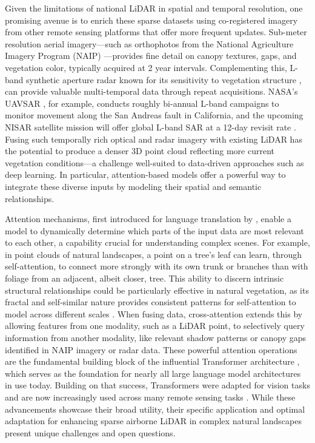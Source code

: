 \documentclass[preprints,article,accept,pdftex,moreauthors]{Definitions/mdpi}
\begin{document}
Given the limitations of national LiDAR in spatial and temporal resolution, one promising avenue is to enrich these sparse datasets using co-registered imagery from other remote sensing platforms that offer more frequent updates.  Sub-meter resolution aerial imagery—such as orthophotos from the National Agriculture Imagery Program (NAIP) \cite{usda_naip_2024}—provides fine detail on canopy textures, gaps, and vegetation color, typically acquired at 2 year intervals. Complementing this, L-band synthetic aperture radar known for its sensitivity to vegetation structure \cite{wang2025interpretable}, can provide valuable multi-temporal data through repeat acquisitions. NASA’s UAVSAR \cite{rosen2006uavsar}, for example, conducts roughly bi-annual L-band campaigns to monitor movement along the San Andreas fault in California, and the upcoming NISAR satellite mission will offer global L-band SAR at a 12-day revisit rate \cite{kellogg2020nasa}. Fusing such temporally rich optical and radar imagery with existing LiDAR has the potential to produce a denser 3D point cloud reflecting more current vegetation conditions—a challenge well-suited to data-driven approaches such as deep learning. In particular, attention-based models offer a powerful way to integrate these diverse inputs by modeling their spatial and semantic relationships.



Attention mechanisms, first introduced for language translation by \cite{bahdanau2014neural}, enable a model to dynamically determine which parts of the input data are most relevant to each other, a capability crucial for understanding complex scenes. For example, in point clouds of natural landscapes, a point on a tree’s leaf can learn, through self-attention, to connect more strongly with its own trunk or branches than with foliage from an adjacent, albeit closer, tree. This ability to discern intrinsic structural relationships could be particularly effective in natural vegetation, as its fractal and self-similar nature provides consistent patterns for self-attention to model across different scales \cite{scheuring1994application, yang2015extraction}. When fusing data, cross-attention extends this by allowing features from one modality, such as a LiDAR point, to selectively query information from another modality, like relevant shadow patterns or canopy gaps identified in NAIP imagery or radar data. These powerful attention operations are the fundamental building block of the influential Transformer architecture \cite{vaswani2017attention}, which serves as the foundation for nearly all large language model architectures in use today. Building on that success, Transformers were adapted for vision tasks \cite{dosovitskiy2020image} and are now increasingly used across many remote sensing tasks \cite{aleissaee2023transformers}. While these advancements showcase their broad utility, their specific application and optimal adaptation for enhancing sparse airborne LiDAR in complex natural landscapes present unique challenges and open questions.
\end{document}
